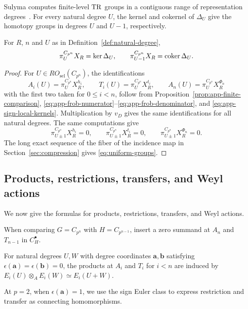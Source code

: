 Sulyma computes finite-level $\operatorname{TR}$ groups in a
contiguous range of representation degrees~\cite[Theorem~4.12]{SulymaNew}.
For every natural degree $U$, the kernel and cokernel of $\Delta_U$ give
the homotopy groups in degrees $U$ and $U-1$, respectively.

\begin{proposition}\label{thm:uniform}
For $R$, $n$ and $U$ as in Definition~\ref{def:natural-degree},
\begin{equation}\label{eq:uniform-groups}
 \pi_U^{C_{p^n}}X_R=\ker\Delta_U,
 \qquad \pi_{U-1}^{C_{p^n}}X_R=\operatorname{coker}\Delta_U.
\end{equation}
\end{proposition}

\begin{proof}
For $U\in RO_{\mathrm{sel}}(C_{p^n})$, the identifications
\[
A_i(U)=\pi_U^{C_{p^n}}X_R^{h_i},\qquad
T_i(U)=\pi_U^{C_{p^n}}X_R^{t_i},\qquad
A_n(U)=\pi_U^{C_{p^n}}X_R^{\Phi_n}
\]
with the first two taken for $0\le i<n$, follow from
Proposition~\ref{prop:app-finite-comparison},
\eqref{eq:app-frob-numerator}--\eqref{eq:app-frob-denominator}, and
\eqref{eq:app-sign-local-kernels}.
Multiplication by $v_D$ gives the same identifications
for all natural degrees. The same computations give
\[
\pi_{U\pm1}^{C_{p^n}}X_R^{h_i}=0,\qquad
\pi_{U\pm1}^{C_{p^n}}X_R^{t_i}=0,\qquad
\pi_{U\pm1}^{C_{p^n}}X_R^{\Phi_n}=0.
\]
The long exact sequence of the fiber of the incidence map
in Section~\ref{sec:compression} gives \eqref{eq:uniform-groups}.
\end{proof}

\subsection{Products, restrictions, transfers, and Weyl actions}
\label{subsec:products-maps}

We now give the formulas for products, restrictions, transfers, and Weyl actions.

When comparing $G=C_{p^n}$ with $H=C_{p^{n-1}}$, insert a zero
summand at $A_n$ and $T_{n-1}$ in $C_H^\bullet$.

For natural degrees $U,W$ with degree coordinates
$\mathbf a,\mathbf b$ satisfying $\epsilon(\mathbf a)=\epsilon(\mathbf b)=0$,
the products at $A_i$ and $T_i$ for $i<n$ are induced by
$E_i(U)\otimes_A E_i(W)\simeq E_i(U+W)$.

At $p=2$, when $\epsilon(\mathbf a)=1$, we use the sign Euler class to
express restriction and transfer as connecting homomorphisms.

